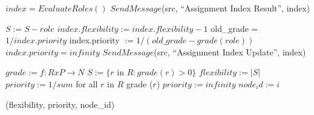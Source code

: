 \documentclass[11pt]{article}
\begin{document}
\begin{algorithmic}
	\State $index = EvaluateRoles()$
	\State $SendMessage$(src, ``Assignment Index Result'', index)
\EndFunction
\end{algorithmic}

\begin{algorithmic}
		\State $S := S - role$
		\State $index.flexibility := index.flexibility - 1$
			\State old\_grade = $1 / index.priority$
			\State index.priority $:= 1 / (old\_grade - grade(role))$
		\Else
			\State $index.priority = infinity$
		\EndIf
	\EndIf
	\State $SendMessage$(src, ``Assignment Index Update'', index)
\EndFunction
\end{algorithmic}

\begin{algorithmic}
	\State $grade :=  f: R x P \rightarrow N$
	\State $S := \{r$ in $R :  grade (r) > 0\}$
        \State $flexibility := | S |$
        		\State $priority := 1 / sum$ for all $r$ in $R$ grade ($r$)
	\Else
		\State $ priority := infinity$
        \EndIf
        \State $node_id := i$

	\Return (flexibility, priority, node\_id)
\EndFunction
\end{algorithmic}
\end{document}

